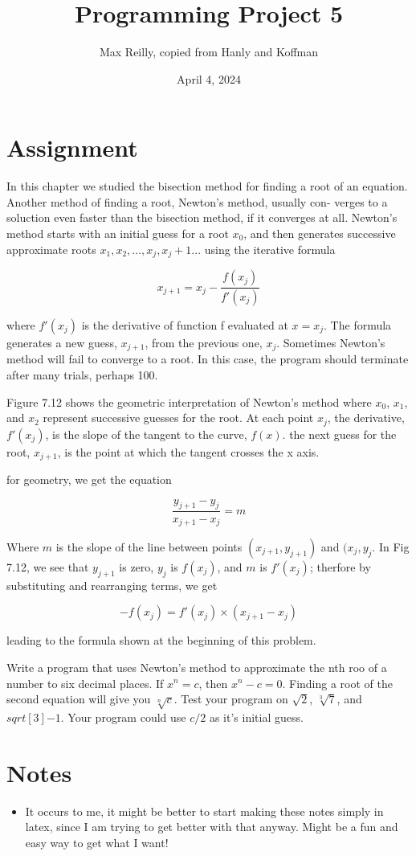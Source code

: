 \documentclass{article}
\begin{document}
\author{Max Reilly, copied from Hanly and Koffman}
\date{April 4, 2024}

\title{Programming Project 5}
\maketitle
\section{Assignment}
In this chapter we studied the bisection method for finding a root of an equation.
Another method of finding a root, Newton's method, usually con-
verges to a soluction even faster than the bisection method, if it converges at
all. Newton's method starts with an initial guess for a root $x_0$, and then
generates successive approximate roots $x_1, x_2, . . . , x_j, x_j+1 . . .$ using the
iterative formula

$$
x_{j+1} = x_j - \frac{f(x_j)}{f'(x_j)}
$$

where $f'(x_j)$ is the derivative of function f evaluated at $x = x_j$. The formula
generates a new guess, $x_{j+1}$, from the previous one, $x_{j}$. Sometimes Newton's
method will fail to converge to a root. In this case, the program should terminate
after many trials, perhaps 100.

Figure 7.12 shows the geometric interpretation of Newton's method where
$x_0$, $x_1$, and $x_2$ represent successive guesses for the root. At each point $x_j$, the
derivative, $f'(x_j)$, is the slope of the tangent to the curve, $f(x)$. the next guess
for the root, $x_{j+1}$, is the point at which the tangent crosses the x axis.

for geometry, we get the equation

$$
\frac{y_{j+1} - y_j}{x_{j+1} - x_j} = m
$$

Where $m$ is the slope of the line between points $(x_{j+1}, y_{j+1})$ and $(x_j, y_j$. In Fig
7.12, we see that $y_{j+1}$ is zero, $y_j$ is $f(x_j)$, and $m$ is $f'(x_j)$; therfore by substituting
and rearranging terms, we get

$$
-f(x_j) = f'(x_j) \times (x_{j+1} - x_j)
$$

leading to the formula shown at the beginning of this problem.

Write a program that uses Newton's method to approximate the nth roo of
a number to six decimal places. If $x^n = c$, then $x^n -c = 0$. Finding a root of
the second equation will give you $\sqrt[n]{c}$. Test your program on $\sqrt{2}$, $\sqrt[3]{7}$, and
$sqrt[3]{-1}$. Your program could use $c/2$ as it's initial guess.

\section{Notes}
\begin{itemize}
    \item It occurs to me, it might be better to start making these notes simply in latex, since I am
            trying to get better with that anyway. Might be a fun and easy way to get what I want!
\end{itemize}
\end{document}
